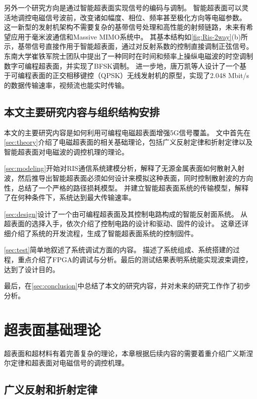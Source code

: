 \documentclass[supercite]{HustGraduPaper}
\begin{document}
另外一个研究方向是通过智能超表面实现信号的编码与调制。
智能超表面可以灵活地调控电磁信号波前，改变诸如幅度、相位、频率甚至极化方向等电磁参数\cite{CHN_zhou2020}。
这一新型的发射机架构不需要复杂的基带信号处理和高性能的射频链路，未来有希望应用于毫米波通信和Massive MIMO系统中。
其基本结构如\autoref{fig:Ris-2way}(b)所示，基带信号直接作用于智能超表面，通过对反射系数的控制直接调制正弦信号。
东南大学崔铁军院士团队中提出了一种同时在时间和频率上操纵电磁波的时空调制数字可编程超表面，并实现了BFSK调制\cite{zhao2019programmable}。
进一步地，唐万凯等人设计了一个基于可编程表面的正交相移键控（QPSK）无线发射机的原型，实现了2.048 Mbit/s的数据传输速率，视频流也能实时传输\cite{Tang2019Wireless}。

\subsection{本文主要研究内容与组织结构安排}

本文的主要研究内容是如何利用可编程电磁超表面增强5G信号覆盖。
文中首先在\autoref{sec:theory}介绍了电磁超表面的相关基础理论，包括广义反射定律和折射定律以及智能超表面对电磁波的调控机理的理论。

\autoref{sec:modeling}开始对RIS通信系统建模分析，解释了无源金属表面如何散射入射波，然后推导出智能超表面必须如何设计来模拟这种表面，同时控制散射波的方向性，总结了一个严格的路径损耗模型。
并建立智能超表面系统的传输模型，解释了在何种条件下，系统达到最大传输速率。

\autoref{sec:design}设计了一个由可编程超表面及其控制电路构成的智能反射面系统。
从超表面的选择入手，依次介绍了控制电路的设计和驱动、固件的设计。
这章还详细介绍了系统的开发流程，生成了智能超表面系统的控制固件。

\autoref{sec:test}简单地叙述了系统调试方面的内容。
描述了系统组成、系统搭建的过程，重点介绍了FPGA的调试与分析。最后的测试结果表明系统能实现波束调控，达到了设计目的。

最后，在\autoref{sec:conclusion}中总结了本文的研究内容，并对未来的研究工作作了初步分析。

\section{超表面基础理论}\label{sec:theory}

超表面和超材料有着完善复杂的理论，本章根据后续内容的需要着重介绍广义斯涅尔定律和超表面对电磁信号的调控机理。

\subsection{广义反射和折射定律}\label{subsec:snell-law}
\end{document}
